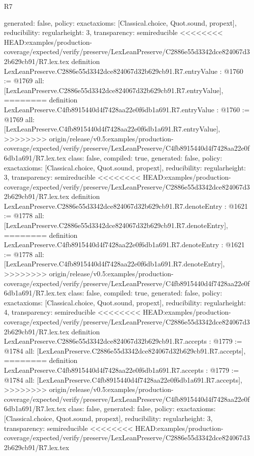 \begin{lexlean}{R7}
\begin{coremodule}
{{{{{{{{{{{{{{{  generated: false,
  policy: exact{axioms: [Classical.choice, Quot.sound, propext]},
  reducibility: regular{height: 3},
  transparency: semireducible
}
<<<<<<<< HEAD:examples/production-coverage/expected/verify/preserve/LexLeanPreserve/C2886e55d3342dce824067d32b629cb91/R7.lex.tex
definition LexLeanPreserve.C2886e55d3342dce824067d32b629cb91.R7.entryValue : @1760 := @1769 {
  all: [LexLeanPreserve.C2886e55d3342dce824067d32b629cb91.R7.entryValue],
========
definition LexLeanPreserve.C4fb8915440d4f7428aa22e0f6db1a691.R7.entryValue : @1760 := @1769 {
  all: [LexLeanPreserve.C4fb8915440d4f7428aa22e0f6db1a691.R7.entryValue],
>>>>>>>> origin/release/v0.5:examples/production-coverage/expected/verify/preserve/LexLeanPreserve/C4fb8915440d4f7428aa22e0f6db1a691/R7.lex.tex
  class: false,
  compiled: true,
  generated: false,
  policy: exact{axioms: [Classical.choice, Quot.sound, propext]},
  reducibility: regular{height: 3},
  transparency: semireducible
}
<<<<<<<< HEAD:examples/production-coverage/expected/verify/preserve/LexLeanPreserve/C2886e55d3342dce824067d32b629cb91/R7.lex.tex
definition LexLeanPreserve.C2886e55d3342dce824067d32b629cb91.R7.denoteEntry : @1621 := @1778 {
  all: [LexLeanPreserve.C2886e55d3342dce824067d32b629cb91.R7.denoteEntry],
========
definition LexLeanPreserve.C4fb8915440d4f7428aa22e0f6db1a691.R7.denoteEntry : @1621 := @1778 {
  all: [LexLeanPreserve.C4fb8915440d4f7428aa22e0f6db1a691.R7.denoteEntry],
>>>>>>>> origin/release/v0.5:examples/production-coverage/expected/verify/preserve/LexLeanPreserve/C4fb8915440d4f7428aa22e0f6db1a691/R7.lex.tex
  class: false,
  compiled: true,
  generated: false,
  policy: exact{axioms: [Classical.choice, Quot.sound, propext]},
  reducibility: regular{height: 4},
  transparency: semireducible
}
<<<<<<<< HEAD:examples/production-coverage/expected/verify/preserve/LexLeanPreserve/C2886e55d3342dce824067d32b629cb91/R7.lex.tex
definition LexLeanPreserve.C2886e55d3342dce824067d32b629cb91.R7.accepts : @1779 := @1784 {
  all: [LexLeanPreserve.C2886e55d3342dce824067d32b629cb91.R7.accepts],
========
definition LexLeanPreserve.C4fb8915440d4f7428aa22e0f6db1a691.R7.accepts : @1779 := @1784 {
  all: [LexLeanPreserve.C4fb8915440d4f7428aa22e0f6db1a691.R7.accepts],
>>>>>>>> origin/release/v0.5:examples/production-coverage/expected/verify/preserve/LexLeanPreserve/C4fb8915440d4f7428aa22e0f6db1a691/R7.lex.tex
  class: false,
  generated: false,
  policy: exact{axioms: [Classical.choice, Quot.sound, propext]},
  reducibility: regular{height: 3},
  transparency: semireducible
}
<<<<<<<< HEAD:examples/production-coverage/expected/verify/preserve/LexLeanPreserve/C2886e55d3342dce824067d32b629cb91/R7.lex.tex
}}}}}}}}}}}}}}}}}
\end{coremodule}
\end{lexlean}

